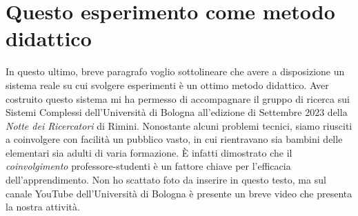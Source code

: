 \section{Questo esperimento come metodo didattico}
In questo ultimo, breve paragrafo voglio sottolineare che avere a disposizione
un sistema reale su cui svolgere esperimenti è un ottimo metodo didattico.
Aver costruito questo sistema mi ha permesso di
accompagnare il gruppo di ricerca sui Sistemi Complessi dell'Università di Bologna
all'edizione di Settembre 2023 della \emph{Notte dei Ricercatori} di Rimini.
Nonostante alcuni problemi tecnici, siamo riusciti a coinvolgere con facilità un pubblico
vasto, in cui rientravano sia bambini delle elementari sia adulti di
varia formazione.
È infatti dimostrato che il \emph{coinvolgimento} professore-studenti
è un fattore chiave per l'efficacia dell'apprendimento.
Non ho scattato foto da inserire in questo testo,
ma sul canale YouTube dell'Università di Bologna è presente un breve
video che presenta la nostra attività.